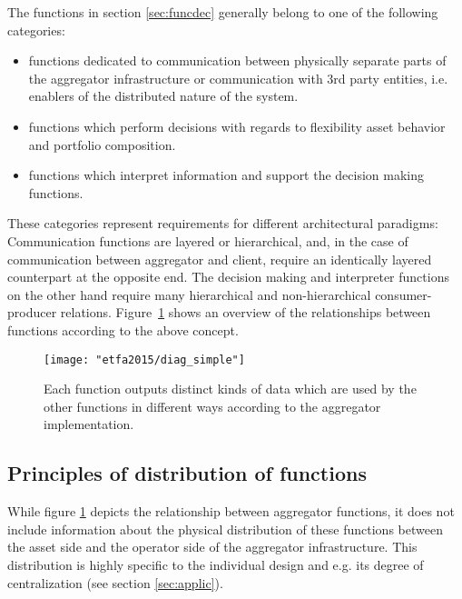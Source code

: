 The functions in section \ref{sec:funcdec} generally belong to one of the following categories:
\begin{itemize}
\item functions dedicated to communication between physically separate parts of the aggregator infrastructure or communication with 3rd party entities, i.e. enablers of the distributed nature of the system.
\item functions which perform decisions with regards to flexibility asset behavior and portfolio composition.
\item functions which interpret information and support the decision making functions. 
\end{itemize}
These categories represent requirements for different architectural paradigms: Communication functions are layered or hierarchical, and, in the case of communication between aggregator and client, require an identically layered counterpart at the opposite end. The decision making and interpreter functions on the other hand require many hierarchical and non-hierarchical consumer-producer relations. %
Figure~\ref{fig:functiondiagram} shows an overview of the relationships between functions according to the above concept.

\begin{figure}[htb]
\centering
\texttt{[image: "etfa2015/diag\_simple"]}
\caption{Each function outputs distinct kinds of data which are used by the other functions in different ways according to the aggregator implementation.}
\label{fig:functiondiagram}
\end{figure}

\subsection{Principles of distribution of functions}

While figure \ref{fig:functiondiagram} depicts the relationship between aggregator functions, it does not include information about the physical distribution of these functions between the asset side and the operator side of the aggregator infrastructure. This distribution is highly specific to the individual design and e.g. its degree of centralization (see section \ref{sec:applic}).

